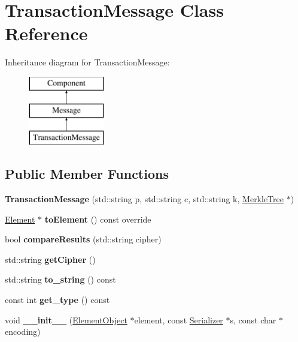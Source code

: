 \hypertarget{classTransactionMessage}{}\section{Transaction\+Message Class Reference}
\label{classTransactionMessage}
Inheritance diagram for Transaction\+Message\+:\begin{figure}[H]
\begin{center}
\leavevmode
\includegraphics[height=3.000000cm]{classTransactionMessage}
\end{center}
\end{figure}
\subsection*{Public Member Functions}
\begin{DoxyCompactItemize}
\item 
\mbox{\label{classTransactionMessage_a799cd2e8ba67ee45ccd1a33af7812491}} 
{\bfseries Transaction\+Message} (std\+::string p, std\+::string c, std\+::string k, \mbox{\hyperlink{classMerkleTree}{Merkle\+Tree}} $\ast$)
\item 
\mbox{\label{classTransactionMessage_ae20e7d6a7b5811bb56a32ec6af59b8e2}} 
\mbox{\hyperlink{classElement}{Element}} $\ast$ {\bfseries to\+Element} () const override
\item 
\mbox{\label{classTransactionMessage_a2f675173842dd85ac77a9f9d09e0f96f}} 
bool {\bfseries compare\+Results} (std\+::string cipher)
\item 
\mbox{\label{classTransactionMessage_abca09bbc62737a7d896f5478f3b3389a}} 
std\+::string {\bfseries get\+Cipher} ()
\item 
\mbox{\label{classTransactionMessage_a537e77b87453affedefffff8b054b82e}} 
std\+::string {\bfseries to\+\_\+string} () const
\item 
\mbox{\label{classMessage_a2a576dcffd45c4574fcdf2897ec26086}} 
const int {\bfseries get\+\_\+type} () const
\item 
\mbox{\label{classComponent_a28212595f8ee85fe009bd233bc99b2fc}} 
void {\bfseries \+\_\+\+\_\+init\+\_\+\+\_\+} (\mbox{\hyperlink{classElementObject}{Element\+Object}} $\ast$element, const \mbox{\hyperlink{classSerializer}{Serializer}} $\ast$s, const char $\ast$encoding)
\end{DoxyCompactItemize}
